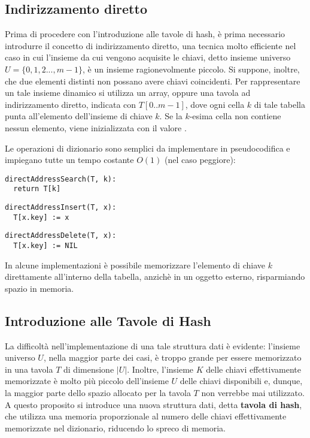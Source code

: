 \subsection{Indirizzamento diretto}
Prima di procedere con l'introduzione alle tavole di hash, è prima necessario introdurre il concetto di indirizzamento diretto, una tecnica molto efficiente nel caso in cui l'insieme da cui vengono acquisite le chiavi, detto insieme universo \(U = \{0,1,2...,m-1\}\), è un insieme ragionevolmente piccolo. Si suppone, inoltre, che due elementi distinti non possano avere chiavi coincidenti. Per rappresentare un tale insieme dinamico si utilizza un array, oppure una tavola ad indirizzamento diretto, indicata con \(T[0..m-1]\), dove ogni cella \(k\) di tale tabella punta all'elemento dell'insieme di chiave \(k\). Se la \(k\)-esima cella non contiene nessun elemento, viene inizializzata con il valore .

Le operazioni di dizionario sono semplici da implementare in pseudocodifica e impiegano tutte un tempo costante \(O(1)\) (nel caso peggiore):

\begin{lstlisting}
directAddressSearch(T, k):
  return T[k]
\end{lstlisting}

\begin{lstlisting}
directAddressInsert(T, x):
  T[x.key] := x 
\end{lstlisting}

\begin{lstlisting}
directAddressDelete(T, x):
  T[x.key] := NIL
\end{lstlisting}

In alcune implementazioni è possibile memorizzare l'elemento di chiave \(k\) direttamente all'interno della tabella, anzichè in un oggetto esterno, risparmiando spazio in memoria. 

\subsection{Introduzione alle Tavole di Hash}

La difficoltà nell'implementazione di una tale struttura dati è evidente: l'insieme universo \(U\), nella maggior parte dei casi, è troppo grande per essere memorizzato in una tavola \(T\) di dimensione \(|U|\). Inoltre, l'insieme \(K\) delle chiavi effettivamente memorizzate è molto più piccolo dell'insieme \(U\) delle chiavi disponibili e, dunque, la maggior parte dello spazio allocato per la tavola \(T\) non verrebbe mai utilizzato. A questo proposito si introduce una nuova struttura dati, detta \textbf{tavola di hash}, che utilizza una memoria proporzionale al numero delle chiavi effettivamente memorizzate nel dizionario, riducendo lo spreco di memoria. 

